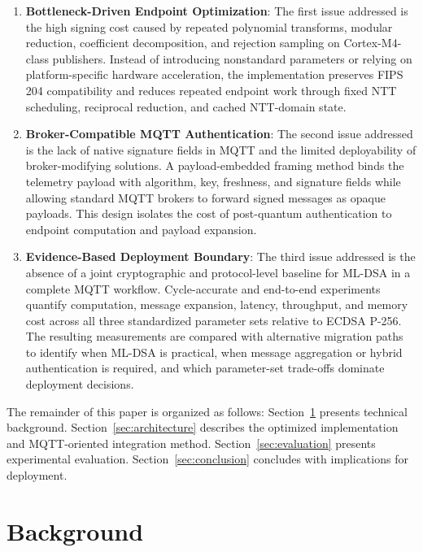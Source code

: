 \documentclass[final, twoside]{IEEEtran} %
\begin{document}
\begin{enumerate}
\item \textbf{Bottleneck-Driven Endpoint Optimization}: The first issue addressed is the high signing cost caused by repeated polynomial transforms, modular reduction, coefficient decomposition, and rejection sampling on Cortex-M4-class publishers. Instead of introducing nonstandard parameters or relying on platform-specific hardware acceleration, the implementation preserves FIPS 204 compatibility and reduces repeated endpoint work through fixed NTT scheduling, reciprocal reduction, and cached NTT-domain state.

\item \textbf{Broker-Compatible MQTT Authentication}: The second issue addressed is the lack of native signature fields in MQTT and the limited deployability of broker-modifying solutions. A payload-embedded framing method binds the telemetry payload with algorithm, key, freshness, and signature fields while allowing standard MQTT brokers to forward signed messages as opaque payloads. This design isolates the cost of post-quantum authentication to endpoint computation and payload expansion.

\item \textbf{Evidence-Based Deployment Boundary}: The third issue addressed is the absence of a joint cryptographic and protocol-level baseline for ML-DSA in a complete MQTT workflow. Cycle-accurate and end-to-end experiments quantify computation, message expansion, latency, throughput, and memory cost across all three standardized parameter sets relative to ECDSA P-256. The resulting measurements are compared with alternative migration paths to identify when ML-DSA is practical, when message aggregation or hybrid authentication is required, and which parameter-set trade-offs dominate deployment decisions.
\end{enumerate}

The remainder of this paper is organized as follows: Section~\ref{sec:related} presents technical background. Section~\ref{sec:architecture} describes the optimized implementation and MQTT-oriented integration method. Section~\ref{sec:evaluation} presents experimental evaluation. Section~\ref{sec:conclusion} concludes with implications for deployment.

\section{Background}\label{sec:related}
\end{document}
